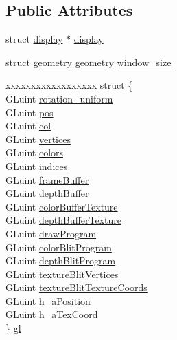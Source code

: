 \subsection*{Public Attributes}
\begin{DoxyCompactItemize}
\item 
struct \hyperlink{structdisplay}{display} $\ast$ \hyperlink{structwindow_a129486f2bd23791194f389ca1405cfd4}{display}
\item 
struct \hyperlink{structgeometry}{geometry} \hyperlink{structgeometry}{geometry} \hyperlink{structwindow_ad2b6c8ed8044b41fd1189a0ce26d539a}{window\-\_\-size}
\item 
\begin{tabbing}
xx\=xx\=xx\=xx\=xx\=xx\=xx\=xx\=xx\=\kill
struct \{\\
\>GLuint \hyperlink{structwindow_a5202f3b60e262a6fa4fcee68dd47cb67}{rotation\_uniform}\\
\>GLuint \hyperlink{structwindow_aaf965f90f9fc938db2315ff62028c362}{pos}\\
\>GLuint \hyperlink{structwindow_aef10fe94766ccd4831ee611c5ad0e55c}{col}\\
\>GLuint \hyperlink{structwindow_aba37ddff444b6d79b605215db77dfd5d}{vertices}\\
\>GLuint \hyperlink{structwindow_a707aa023203655374dc8ee1425ad81c5}{colors}\\
\>GLuint \hyperlink{structwindow_a669d3d1d362ac34ddc5dfcc7dd4bc258}{indices}\\
\>GLuint \hyperlink{structwindow_a5e3810549f0160f18cef64c93bdd8278}{frameBuffer}\\
\>GLuint \hyperlink{structwindow_af72060df9155bae3d293b91993e35bda}{depthBuffer}\\
\>GLuint \hyperlink{structwindow_ac0b91590483870dc5f0b20c09b53fed7}{colorBufferTexture}\\
\>GLuint \hyperlink{structwindow_a747c753851bb1eca93c472367eca55a3}{depthBufferTexture}\\
\>GLuint \hyperlink{structwindow_a0bd2bc43c368909c5715ed148325083e}{drawProgram}\\
\>GLuint \hyperlink{structwindow_afcddaf6e638b4372072dbcb758cadc3d}{colorBlitProgram}\\
\>GLuint \hyperlink{structwindow_acd8864dbabe48d600ede80ce22fc4704}{depthBlitProgram}\\
\>GLuint \hyperlink{structwindow_a38cefb56177a697abbd43518de429a61}{textureBlitVertices}\\
\>GLuint \hyperlink{structwindow_a666b2eb3384260dab74b71b53cf64ae0}{textureBlitTextureCoords}\\
\>GLuint \hyperlink{structwindow_aad6fbe6b4e8c274d5e9d643fb2f83a85}{h\_aPosition}\\
\>GLuint \hyperlink{structwindow_a1ed9df968b031386245164482467fd38}{h\_aTexCoord}\\
\} \hyperlink{structwindow_a6975a930e9a3c166f8201fc4ef5e7728}{gl}\\


\end{tabbing}
\end{DoxyCompactItemize}
